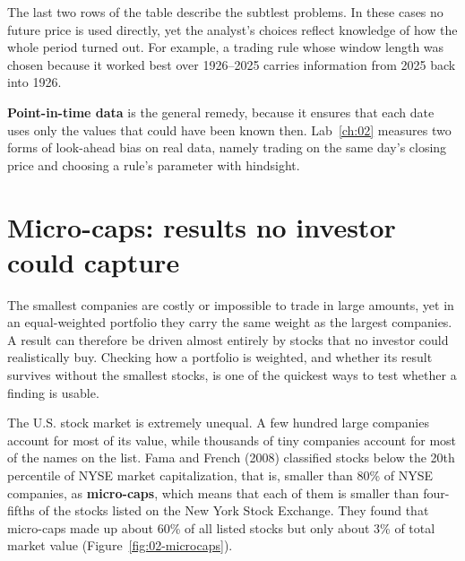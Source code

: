 The last two rows of the table describe the subtlest problems. In these cases no future price is used directly, yet the analyst's choices reflect knowledge of how the whole period turned out. For example, a trading rule whose window length was chosen because it worked best over 1926--2025 carries information from 2025 back into 1926.

\textbf{Point-in-time data} is the general remedy, because it ensures that each date uses only the values that could have been known then. Lab~\ref{ch:02} measures two forms of look-ahead bias on real data, namely trading on the same day's closing price and choosing a rule's parameter with hindsight.

\section{Micro-caps: results no investor could capture}
\label{sec:02-microcaps}

The smallest companies are costly or impossible to trade in large amounts, yet in an equal-weighted portfolio they carry the same weight as the largest companies. A result can therefore be driven almost entirely by stocks that no investor could realistically buy. Checking how a portfolio is weighted, and whether its result survives without the smallest stocks, is one of the quickest ways to test whether a finding is usable.

The U.S. stock market is extremely unequal. A few hundred large companies account for most of its value, while thousands of tiny companies account for most of the names on the list. Fama and French (2008) classified stocks below the 20th percentile of NYSE market capitalization, that is, smaller than 80\% of NYSE companies, as \textbf{micro-caps}, which means that each of them is smaller than four-fifths of the stocks listed on the New York Stock Exchange. They found that micro-caps made up about 60\% of all listed stocks but only about 3\% of total market value (Figure~\ref{fig:02-microcaps}).




